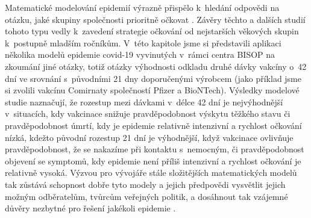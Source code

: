 Matematické modelování epidemií výrazně přispělo k~hledání odpovědi na otázku, jaké skupiny společnosti prioritně očkovat \cite{Bubar_etal2021,Moore_etal2021b}. Závěry těchto a dalších studií tohoto typu vedly k~zavedení strategie očkování od nejstarších věkových skupin k~postupně mladším ročníkům. V~této kapitole jsme si představili aplikaci několika modelů epidemie covid-19 vyvinutých v~rámci centra BISOP na zkoumání jiné otázky, totiž otázky výhodnosti odkladu druhé dávky vakcíny o~42 dní ve srovnání s~původními 21 dny doporučenými výrobcem (jako příklad jsme si zvolili vakcínu Comirnaty společností Pfizer a BioNTech). Výsledky modelové studie naznačují, že rozestup mezi dávkami v~délce 42 dní je nejvýhodnější v~situacích, kdy vakcinace snižuje pravděpodobnost výskytu těžkého stavu či pravděpodobnost úmrtí, kdy je epidemie relativně intenzivní a rychlost očkování nízká, kdežto původní rozestup 21 dní je výhodnější, když vakcinace ovlivňuje pravděpodobnost, že se nakazíme při kontaktu s~nemocným, či pravděpodobnost objevení se symptomů, kdy epidemie není příliš intenzivní a rychlost očkování je relativně vysoká. Výzvou pro vývojáře stále složitějších matematických modelů tak zůstává schopnost dobře tyto modely a jejich předpovědi vysvětlit jejich možným odběratelům, tvůrcům veřejných politik, a dosáhnout tak vzájemné důvěry nezbytné pro řešení jakékoli epidemie \cite{BasuAndrews2013}.

